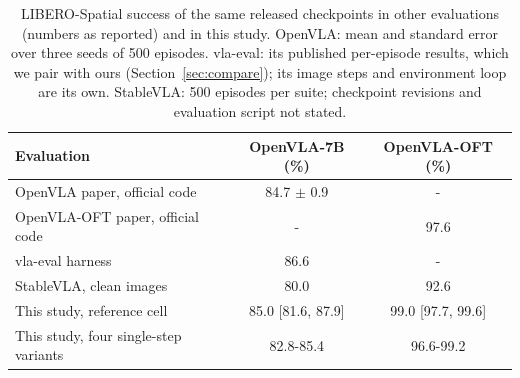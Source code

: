 \begin{table}[t]
\caption{LIBERO-Spatial success of the same released checkpoints in other evaluations (numbers as reported) and in this study. OpenVLA: mean and standard error over three seeds of 500 episodes. vla-eval: its published per-episode results, which we pair with ours (Section~\ref{sec:compare}); its image steps and environment loop are its own. StableVLA: 500 episodes per suite; checkpoint revisions and evaluation script not stated.}
\label{tab:compare}
\centering
\small
\begin{tabular}{@{}lcc@{}}
\toprule
Evaluation & OpenVLA-7B (\%) & OpenVLA-OFT (\%) \\
\midrule
OpenVLA paper, official code~\citep{openvla} & 84.7 $\pm$ 0.9 & - \\
OpenVLA-OFT paper, official code~\citep{oft} & - & 97.6 \\
vla-eval harness~\citep{vlaevalrepo} & 86.6 & - \\
StableVLA, clean images~\citep{stablevla} & 80.0 & 92.6 \\
\midrule
This study, reference cell & 85.0 [81.6, 87.9] & 99.0 [97.7, 99.6] \\
This study, four single-step variants & 82.8-85.4 & 96.6-99.2 \\
\bottomrule
\end{tabular}
\end{table}
